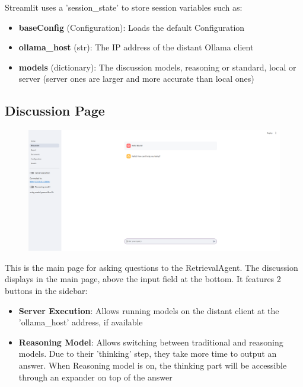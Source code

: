 \documentclass[11pt,a4paper]{report}
\begin{document}
Streamlit uses a 'session\_state' to store session variables such as:

\begin{itemize}
    \item \textbf{baseConfig} (Configuration): Loads the default Configuration
    \item \textbf{ollama\_host} (str): The IP address of the distant Ollama client
    \item \textbf{models} (dictionary): The discussion models, reasoning or standard, local or server (server ones are larger and more accurate than local ones)
\end{itemize}

\subsection{Discussion Page}

\begin{figure}[H]
    \centering
    \includegraphics[width=1\linewidth]{static/figures/discussionPage.png}
    \label{fig:discussionPage}
\end{figure}

This is the main page for asking questions to the RetrievalAgent. The discussion displays in the main page, above the input field at the bottom. It features 2 buttons in the sidebar:

\begin{itemize}
    \item \textbf{Server Execution}: Allows running models on the distant client at the 'ollama\_host' address, if available
    \item \textbf{Reasoning Model}: Allows switching between traditional and reasoning models. Due to their 'thinking' step, they take more time to output an answer. When Reasoning model is on, the thinking part will be accessible through an expander on top of the answer
\end{itemize}
\end{document}
